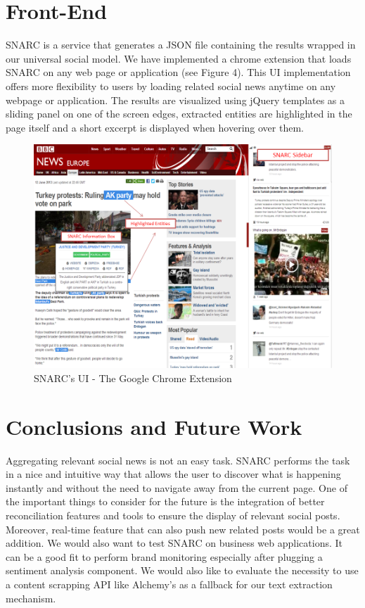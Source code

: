 \documentclass[oribibl]{llncs}
\begin{document}
\section{Front-End}
SNARC is a service that generates a JSON file containing the results wrapped in our universal social model. We have implemented a chrome extension that loads SNARC on any web page or application (see Figure 4). This UI implementation offers more flexibility to users by loading related social news anytime on any webpage or application. The results are visualized using jQuery templates as a sliding panel on one of the screen edges, extracted entities are highlighted in the page itself and a short excerpt is displayed when hovering over them.
\begin{figure}[h!]
  \centering
    \includegraphics[scale=0.45]{SNARC-annotated.png} 
  \caption{SNARC's UI - The Google Chrome Extension}
\end{figure}


\section{Conclusions and Future Work}
Aggregating relevant social news is not an easy task. SNARC performs the task in a nice and intuitive way that allows the user to discover what is happening instantly and without the need to navigate away from the current page. One of the important things to consider for the future is the integration of better reconciliation features and tools to ensure the display of relevant social posts. Moreover, real-time feature that can also push new related posts would be a great addition. We would also want to test SNARC on business web applications. It can be a good fit to perform brand monitoring especially after plugging a sentiment analysis component. We would also like to evaluate the necessity to use a content scrapping API like Alchemy’s as a fallback for our text extraction mechanism.



\end{document}
